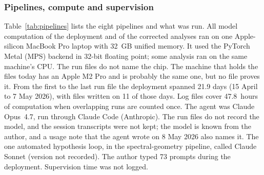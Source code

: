 \documentclass[10pt,letterpaper]{article}
\begin{document}
\subsubsection*{Pipelines, compute and supervision}
Table~\ref{tab:pipelines} lists the eight pipelines and what was run.
All model computation of the deployment and of the corrected analyses ran
on one Apple-silicon MacBook Pro laptop with
32~GB unified memory. It used the PyTorch Metal (MPS) backend in 32-bit
floating point; some analysis ran on the same machine's CPU. The run
files do not name the chip. The machine that holds the files today has
an Apple M2 Pro and is probably the same one, but no file proves it.
From the first to the last run file the deployment spanned 21.9 days (15 April to 7 May 2026), with
files written on 11 of those days. Log files cover 47.8~hours of
computation when overlapping runs are counted once. The agent was Claude
Opus~4.7, run through Claude Code (Anthropic). The run files do not
record the model, and the session transcripts were not kept; the model is
known from the author, and a usage note that the agent wrote on 8 May
2026 also names it. The one automated hypothesis loop, in the
spectral-geometry pipeline, called Claude Sonnet (version not recorded).
The author typed 73
prompts during the deployment. Supervision time was not logged.
\end{document}
